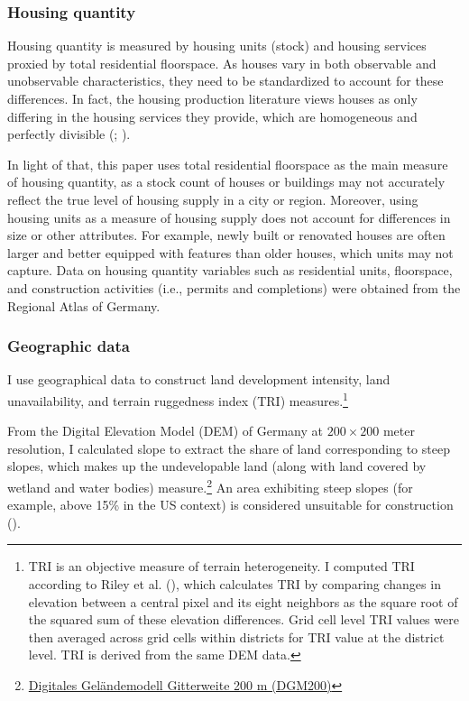 \documentclass[
  12pt,
]{article}
\begin{document}
\subsubsection{Housing quantity}\label{housing-quantity}

Housing quantity is measured by housing units (stock) and housing services proxied by total residential floorspace. As houses vary in both observable and unobservable characteristics, they need to be standardized to account for these differences. In fact, the housing production literature views houses as only differing in the housing services they provide, which are homogeneous and perfectly divisible (; ).

In light of that, this paper uses total residential floorspace as the main measure of housing quantity, as a stock count of houses or buildings may not accurately reflect the true level of housing supply in a city or region. Moreover, using housing units as a measure of housing supply does not account for differences in size or other attributes. For example, newly built or renovated houses are often larger and better equipped with features than older houses, which units may not capture. Data on housing quantity variables such as residential units, floorspace, and construction activities (i.e., permits and completions) were obtained from the Regional Atlas of Germany.

\subsubsection{Geographic data}\label{geographic-data}

I use geographical data to construct land development intensity, land unavailability, and terrain ruggedness index (TRI) measures.\footnote{TRI is an objective measure of terrain heterogeneity. I computed TRI according to Riley et al. (), which calculates TRI by comparing changes in elevation between a central pixel and its eight neighbors as the square root of the squared sum of these elevation differences. Grid cell level TRI values were then averaged across grid cells within districts for TRI value at the district level. TRI is derived from the same DEM data.}

From the Digital Elevation Model (DEM) of Germany at \(200\times200\) meter resolution, I calculated slope to extract the share of land corresponding to steep slopes, which makes up the undevelopable land (along with land covered by wetland and water bodies) measure.\footnote{\href{https://gdz.bkg.bund.de/index.php/default/digitale-geodaten/digitale-gelandemodelle/digitales-gelandemodell-gitterweite-200-m-dgm200.html}{Digitales Geländemodell Gitterweite 200 m (DGM200)}} An area exhibiting steep slopes (for example, above 15\% in the US context) is considered unsuitable for construction ().
\end{document}
